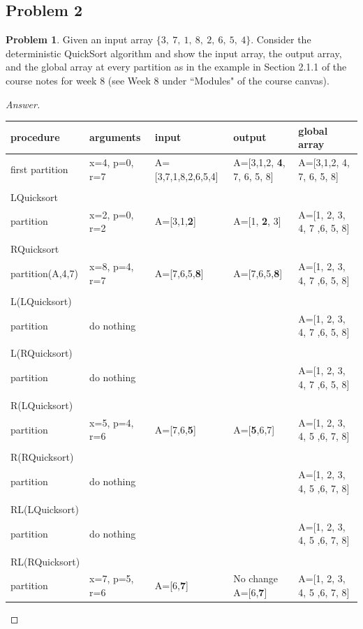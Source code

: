 \documentclass[11pt]{article}
\theoremstyle{definition}
\theoremstyle{definition}
\newtheorem{required}{Problem}
\theoremstyle{definition}
\begin{document}
\subsection{Problem 2}
\begin{required}
Given an input array $\{3,~7,~1,~8,~2,~6,~5,~4\}$. Consider the deterministic QuickSort algorithm and show the input array, the output array, and the global array at every partition as in the example in Section 2.1.1 of the course notes for week 8 (see Week 8 under ``Modules" of the course canvas). 

\begin{proof}[Answer]
\begin{tabular}{lll | ll}

procedure  &  arguments  &  input  &  output  &  global array  \\
\hline
first partition &  x=4, p=0, r=7  &  A=[3,7,1,8,2,6,5,4]  & A=[3,1,2, \textbf{4}, 7, 6, 5, 8] &  A=[3,1,2, 4, 7, 6, 5, 8] \\
\\
LQuicksort \\ partition & x=2, p=0, r=2 &  A=[3,1,\textbf{2}]  & A=[1, \textbf{2}, 3]  &  A=[1, 2, 3, 4, 7 ,6, 5, 8] \\
\\
RQuicksort \\partition(A,4,7) &  x=8, p=4, r=7  &  A=[7,6,5,\textbf{8}]  &  A=[7,6,5,\textbf{8}]  &  A=[1, 2, 3, 4, 7 ,6, 5, 8] \\
\\
L(LQuicksort) \\ partition & do nothing &    &  &  A=[1, 2, 3, 4, 7 ,6, 5, 8] \\
\\
L(RQuicksort) \\ partition & do nothing &    &  &  A=[1, 2, 3, 4, 7 ,6, 5, 8] \\
\\
R(LQuicksort) \\ partition &  x=5, p=4, r=6  &  A=[7,6,\textbf{5}]  &  A=[\textbf{5},6,7]  &  A=[1, 2, 3, 4, 5 ,6, 7, 8]  \\
\\
R(RQuicksort) \\ partition & do nothing &  &    &  A=[1, 2, 3, 4, 5 ,6, 7, 8]  \\
\\
RL(LQuicksort) \\ partition & do nothing &  &    &  A=[1, 2, 3, 4, 5 ,6, 7, 8]  \\
\\
RL(RQuicksort) \\ partition &  x=7, p=5, r=6  &  A=[6,\textbf{7}]  &  No change A=[6,\textbf{7}]  &  A=[1, 2, 3, 4, 5 ,6, 7, 8]  \\


\end{tabular}
\end{proof}
\end{required}
\end{document}
